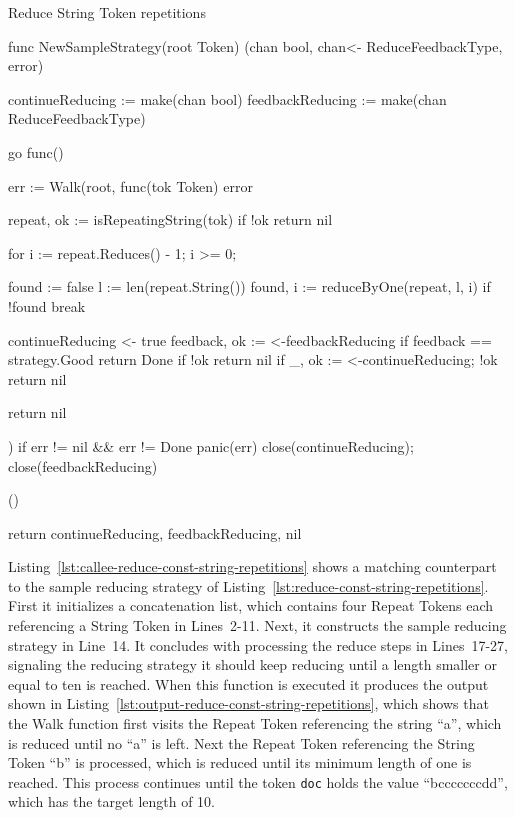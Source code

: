 \begin{listing}[ht]
\caption{Reduce String Token repetitions}
\label{lst:reduce-const-string-repetitions}
\begin{gocode}
func NewSampleStrategy(root Token) (chan bool, chan<- ReduceFeedbackType, error) {
	continueReducing := make(chan bool)
	feedbackReducing := make(chan ReduceFeedbackType)

	go func() {
		err := Walk(root, func(tok Token) error {
			repeat, ok := isRepeatingString(tok)
			if !ok { return nil }

			for i := repeat.Reduces() - 1; i >= 0; {
				found := false
				l := len(repeat.String())
				found, i := reduceByOne(repeat, l, i)
				if !found { break }

				continueReducing <- true
				feedback, ok := <-feedbackReducing
				if feedback == strategy.Good { return Done }
				if !ok { return nil }
				if _, ok := <-continueReducing; !ok { return nil }
			}

			return nil
		})
		if err != nil && err != Done { panic(err) }
		close(continueReducing); close(feedbackReducing)
	}()

	return continueReducing, feedbackReducing, nil
}
\end{gocode}
\end{listing}

Listing~\ref{lst:callee-reduce-const-string-repetitions} shows a matching counterpart to the sample reducing strategy of Listing~\ref{lst:reduce-const-string-repetitions}. First it initializes a concatenation list, which contains four Repeat Tokens each referencing a String Token in Lines~2-11. Next, it constructs the sample reducing strategy in Line~14. It concludes with processing the reduce steps in Lines~17-27, signaling the reducing strategy it should keep reducing until a length smaller or equal to ten is reached. When this function is executed it produces the output shown in Listing~\ref{lst:output-reduce-const-string-repetitions}, which shows that the Walk function first visits the Repeat Token referencing the string \enquote{a}, which is reduced until no \enquote{a} is left. Next the Repeat Token referencing the String Token \enquote{b} is processed, which is reduced until its minimum length of one is reached. This process continues until the token \texttt{doc} holds the value \enquote{bcccccccdd}, which has the target length of 10.

